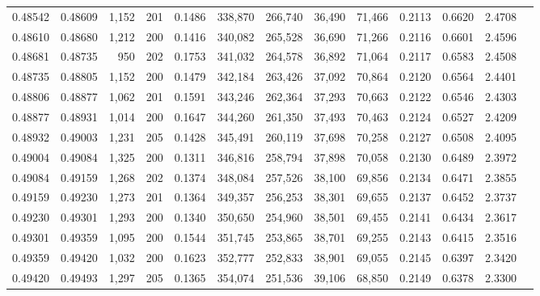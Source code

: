 \begin{tabular}{rrrrrrrrrrrrr}
0.48542 & 0.48609 & 1,152 & 201 &                                     0.1486 & 338,870 & 266,740 &  36,490 &  71,466 & 0.2113 & 0.6620 & 2.4708 \\
0.48610 & 0.48680 & 1,212 & 200 &                                     0.1416 & 340,082 & 265,528 &  36,690 &  71,266 & 0.2116 & 0.6601 & 2.4596 \\
0.48681 & 0.48735 &   950 & 202 &                                     0.1753 & 341,032 & 264,578 &  36,892 &  71,064 & 0.2117 & 0.6583 & 2.4508 \\
0.48735 & 0.48805 & 1,152 & 200 &                                     0.1479 & 342,184 & 263,426 &  37,092 &  70,864 & 0.2120 & 0.6564 & 2.4401 \\
0.48806 & 0.48877 & 1,062 & 201 &                                     0.1591 & 343,246 & 262,364 &  37,293 &  70,663 & 0.2122 & 0.6546 & 2.4303 \\
0.48877 & 0.48931 & 1,014 & 200 &                                     0.1647 & 344,260 & 261,350 &  37,493 &  70,463 & 0.2124 & 0.6527 & 2.4209 \\
0.48932 & 0.49003 & 1,231 & 205 &                                     0.1428 & 345,491 & 260,119 &  37,698 &  70,258 & 0.2127 & 0.6508 & 2.4095 \\
0.49004 & 0.49084 & 1,325 & 200 &                                     0.1311 & 346,816 & 258,794 &  37,898 &  70,058 & 0.2130 & 0.6489 & 2.3972 \\
0.49084 & 0.49159 & 1,268 & 202 &                                     0.1374 & 348,084 & 257,526 &  38,100 &  69,856 & 0.2134 & 0.6471 & 2.3855 \\
0.49159 & 0.49230 & 1,273 & 201 &                                     0.1364 & 349,357 & 256,253 &  38,301 &  69,655 & 0.2137 & 0.6452 & 2.3737 \\
0.49230 & 0.49301 & 1,293 & 200 &                                     0.1340 & 350,650 & 254,960 &  38,501 &  69,455 & 0.2141 & 0.6434 & 2.3617 \\
0.49301 & 0.49359 & 1,095 & 200 &                                     0.1544 & 351,745 & 253,865 &  38,701 &  69,255 & 0.2143 & 0.6415 & 2.3516 \\
0.49359 & 0.49420 & 1,032 & 200 &                                     0.1623 & 352,777 & 252,833 &  38,901 &  69,055 & 0.2145 & 0.6397 & 2.3420 \\
0.49420 & 0.49493 & 1,297 & 205 &                                     0.1365 & 354,074 & 251,536 &  39,106 &  68,850 & 0.2149 & 0.6378 & 2.3300 \\

\end{tabular}
